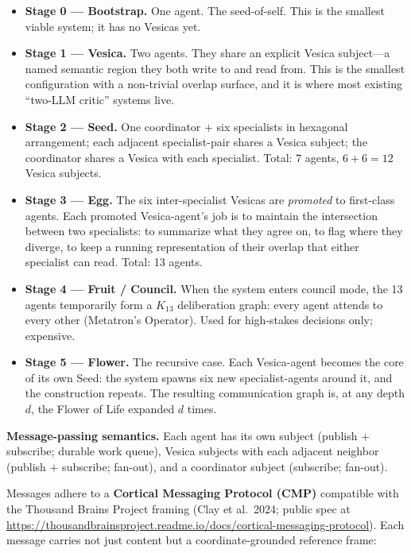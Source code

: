 \documentclass[11pt,a4paper]{article}
\begin{document}
\begin{itemize}[leftmargin=*]
  \item \textbf{Stage 0 --- Bootstrap.} One agent. The seed-of-self. This is the smallest viable system; it has no Vesicas yet.
  \item \textbf{Stage 1 --- Vesica.} Two agents. They share an explicit Vesica subject---a named semantic region they both write to and read from. This is the smallest configuration with a non-trivial overlap surface, and it is where most existing ``two-LLM critic'' systems live.
  \item \textbf{Stage 2 --- Seed.} One coordinator $+$ six specialists in hexagonal arrangement; each adjacent specialist-pair shares a Vesica subject; the coordinator shares a Vesica with each specialist. Total: 7 agents, $6 + 6 = 12$ Vesica subjects.
  \item \textbf{Stage 3 --- Egg.} The six inter-specialist Vesicas are \emph{promoted} to first-class agents. Each promoted Vesica-agent's job is to maintain the intersection between two specialists: to summarize what they agree on, to flag where they diverge, to keep a running representation of their overlap that either specialist can read. Total: 13 agents.
  \item \textbf{Stage 4 --- Fruit / Council.} When the system enters council mode, the 13 agents temporarily form a $K_{13}$ deliberation graph: every agent attends to every other (Metatron's Operator). Used for high-stakes decisions only; expensive.
  \item \textbf{Stage 5 --- Flower.} The recursive case. Each Vesica-agent becomes the core of its own Seed: the system spawns six new specialist-agents around it, and the construction repeats. The resulting communication graph is, at any depth $d$, the Flower of Life expanded $d$ times.
\end{itemize}

\textbf{Message-passing semantics.} Each agent has its own subject (publish $+$ subscribe; durable work queue), Vesica subjects with each adjacent neighbor (publish $+$ subscribe; fan-out), and a coordinator subject (subscribe; fan-out).

Messages adhere to a \textbf{Cortical Messaging Protocol (CMP)} compatible with the Thousand Brains Project framing (Clay et al.\ 2024; public spec at \url{https://thousandbrainsproject.readme.io/docs/cortical-messaging-protocol}). Each message carries not just content but a coordinate-grounded reference frame:
\end{document}
